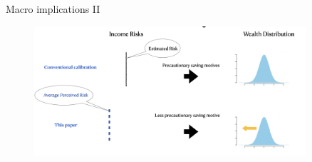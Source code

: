 \documentclass{beamer}
\begin{document}
\begin{frame}{Macro implications II}
\begin{figure}
	\centering
	\label{fig: implication2}
	\includegraphics[width=0.9\textwidth]{figures/implication2.png}
\end{figure}
\end{frame}
\end{document}
